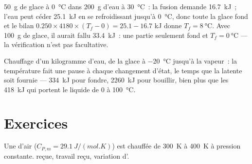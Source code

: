 \begin{example}\label{ex:b1:first-law:ice}
\qty{50}{g} de glace à \qty{0}{\degreeCelsius} dans \qty{200}{g} d'eau à
\qty{30}{\degreeCelsius}~: la fusion demande \qty{16.7}{kJ}~; l'eau peut
céder \qty{25.1}{kJ} en se refroidissant jusqu'à \qty{0}{\degreeCelsius},
donc toute la glace fond et le bilan $0.250 \times 4180 \times (T_f - 0) = 25.1 - 16.7$ kJ donne
$T_f = \qty{8}{\degreeCelsius}$. Avec \qty{100}{g} de glace, il aurait fallu
\qty{33.4}{kJ}~: une partie seulement fond et $T_f = \qty{0}{\degreeCelsius}$
--- la vérification n'est pas facultative.
\end{example}

\begin{omfigure}

{\small Chauffage d'un kilogramme d'eau, de la glace à
\qty{-20}{\degreeCelsius} jusqu'à la vapeur~: la température fait une pause
à chaque changement d'état, le temps que la  latente soit fournie
--- \qty{334}{kJ} pour fondre, \qty{2260}{kJ} pour bouillir, bien plus que
les \qty{418}{kJ} qui portent le liquide de \qty{0}{} à \qty{100}{\degreeCelsius}.}
\end{omfigure}

\section{Exercices}

\begin{exercise}[$\star$]\label{exo:b1:first-law:1}
Une  d'air ($C_{P,m} = \qty{29.1}{J/(mol.K)}$) est chauffée de
\qty{300}{K} à \qty{400}{K} à pression constante.  reçue, travail
reçu, variation d'.
\end{exercise}

